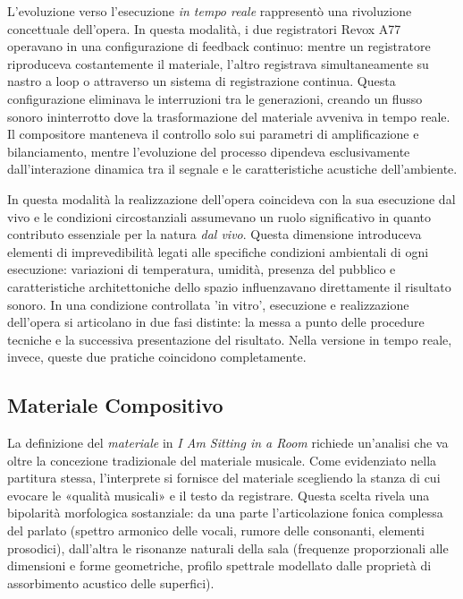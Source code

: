 L'evoluzione verso l'esecuzione \textit{in tempo reale} rappresentò una rivoluzione concettuale dell'opera. In questa modalità, i due registratori Revox A77 operavano in una configurazione di feedback continuo: mentre un registratore riproduceva costantemente il materiale, l'altro registrava simultaneamente su nastro a loop o attraverso un sistema di registrazione continua. Questa configurazione eliminava le interruzioni tra le generazioni, creando un flusso sonoro ininterrotto dove la trasformazione del materiale avveniva in tempo reale. Il compositore manteneva il controllo solo sui parametri di amplificazione e bilanciamento, mentre l'evoluzione del processo dipendeva esclusivamente dall'interazione dinamica tra il segnale e le caratteristiche acustiche dell'ambiente.

In questa modalità la realizzazione dell'opera coincideva con la sua esecuzione dal vivo e le condizioni circostanziali assumevano un ruolo significativo in quanto contributo essenziale per la natura \textit{dal vivo}. Questa dimensione introduceva elementi di imprevedibilità legati alle specifiche condizioni ambientali di ogni esecuzione: variazioni di temperatura, umidità, presenza del pubblico e caratteristiche architettoniche dello spazio influenzavano direttamente il risultato sonoro. In una condizione controllata 'in vitro', esecuzione e realizzazione dell'opera si articolano in due fasi distinte: la messa a punto delle procedure tecniche e la successiva presentazione del risultato. Nella versione in tempo reale, invece, queste due pratiche coincidono completamente.

\subsection{Materiale Compositivo}

La definizione del \textit{materiale} in \textit{I Am Sitting in a Room} richiede un'analisi che va oltre la concezione tradizionale del materiale musicale. Come evidenziato nella partitura stessa, l'interprete si fornisce del materiale scegliendo la stanza di cui evocare le «qualità musicali» e il testo da registrare. Questa scelta rivela una bipolarità morfologica sostanziale: da una parte l'articolazione fonica complessa del parlato (spettro armonico delle vocali, rumore delle consonanti, elementi prosodici), dall'altra le risonanze naturali della sala (frequenze proporzionali alle dimensioni e forme geometriche, profilo spettrale modellato dalle proprietà di assorbimento acustico delle superfici).

